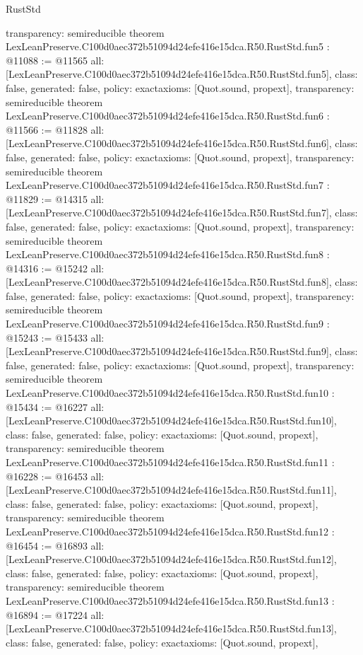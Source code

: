 \begin{lexlean}{RustStd}
\begin{coremodule}
{  transparency: semireducible
}
theorem LexLeanPreserve.C100d0aec372b51094d24efe416e15dca.R50.RustStd.fun5 : @11088 := @11565 {
  all: [LexLeanPreserve.C100d0aec372b51094d24efe416e15dca.R50.RustStd.fun5],
  class: false,
  generated: false,
  policy: exact{axioms: [Quot.sound, propext]},
  transparency: semireducible
}
theorem LexLeanPreserve.C100d0aec372b51094d24efe416e15dca.R50.RustStd.fun6 : @11566 := @11828 {
  all: [LexLeanPreserve.C100d0aec372b51094d24efe416e15dca.R50.RustStd.fun6],
  class: false,
  generated: false,
  policy: exact{axioms: [Quot.sound, propext]},
  transparency: semireducible
}
theorem LexLeanPreserve.C100d0aec372b51094d24efe416e15dca.R50.RustStd.fun7 : @11829 := @14315 {
  all: [LexLeanPreserve.C100d0aec372b51094d24efe416e15dca.R50.RustStd.fun7],
  class: false,
  generated: false,
  policy: exact{axioms: [Quot.sound, propext]},
  transparency: semireducible
}
theorem LexLeanPreserve.C100d0aec372b51094d24efe416e15dca.R50.RustStd.fun8 : @14316 := @15242 {
  all: [LexLeanPreserve.C100d0aec372b51094d24efe416e15dca.R50.RustStd.fun8],
  class: false,
  generated: false,
  policy: exact{axioms: [Quot.sound, propext]},
  transparency: semireducible
}
theorem LexLeanPreserve.C100d0aec372b51094d24efe416e15dca.R50.RustStd.fun9 : @15243 := @15433 {
  all: [LexLeanPreserve.C100d0aec372b51094d24efe416e15dca.R50.RustStd.fun9],
  class: false,
  generated: false,
  policy: exact{axioms: [Quot.sound, propext]},
  transparency: semireducible
}
theorem LexLeanPreserve.C100d0aec372b51094d24efe416e15dca.R50.RustStd.fun10 : @15434 := @16227 {
  all: [LexLeanPreserve.C100d0aec372b51094d24efe416e15dca.R50.RustStd.fun10],
  class: false,
  generated: false,
  policy: exact{axioms: [Quot.sound, propext]},
  transparency: semireducible
}
theorem LexLeanPreserve.C100d0aec372b51094d24efe416e15dca.R50.RustStd.fun11 : @16228 := @16453 {
  all: [LexLeanPreserve.C100d0aec372b51094d24efe416e15dca.R50.RustStd.fun11],
  class: false,
  generated: false,
  policy: exact{axioms: [Quot.sound, propext]},
  transparency: semireducible
}
theorem LexLeanPreserve.C100d0aec372b51094d24efe416e15dca.R50.RustStd.fun12 : @16454 := @16893 {
  all: [LexLeanPreserve.C100d0aec372b51094d24efe416e15dca.R50.RustStd.fun12],
  class: false,
  generated: false,
  policy: exact{axioms: [Quot.sound, propext]},
  transparency: semireducible
}
theorem LexLeanPreserve.C100d0aec372b51094d24efe416e15dca.R50.RustStd.fun13 : @16894 := @17224 {
  all: [LexLeanPreserve.C100d0aec372b51094d24efe416e15dca.R50.RustStd.fun13],
  class: false,
  generated: false,
  policy: exact{axioms: [Quot.sound, propext]},
}
\end{coremodule}
\end{lexlean}

